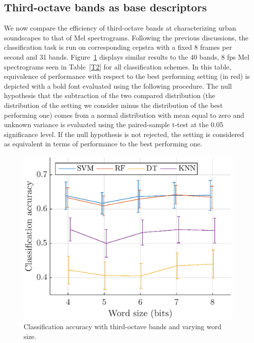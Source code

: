 \documentclass[final,3p,times,twocolumn]{elsarticle}
\begin{document}
\subsection{Third-octave bands as base descriptors}

We now compare the efficiency of third-octave bands at characterizing urban soundscapes to that of Mel spectrograms. Following the previous discussions, the classification task is run on corresponding cepstra with a fixed 8 frames per second and 31 bands. Figure~\ref{fig:class_tob_q} displays similar results to the 40 bands, 8 fps Mel spectrograms seen in Table~\ref{T2} for all classification schemes. In this table, equivalence of performance with respect to the best performing setting (in red) is depicted with a bold font evaluated using the following procedure. The null hypothesis that the subtraction of the two compared distribution (the distribution of the setting we consider minus the distribution of the best performing one) comes from a normal distribution with mean equal to zero and unknown variance is evaluated using the paired-sample t-test at the 0.05 significance level. If the null hypothesis is not rejected, the setting is considered as equivalent in terms of performance to the best performing one. \\

\begin{figure}[htbp]
	\centering
		\includegraphics[width=\columnwidth]{figures/class_tob_q.eps}
	\caption{Classification accuracy with third-octave bands and varying word size.}
	\label{fig:class_tob_q}
\end{figure}
\end{document}
